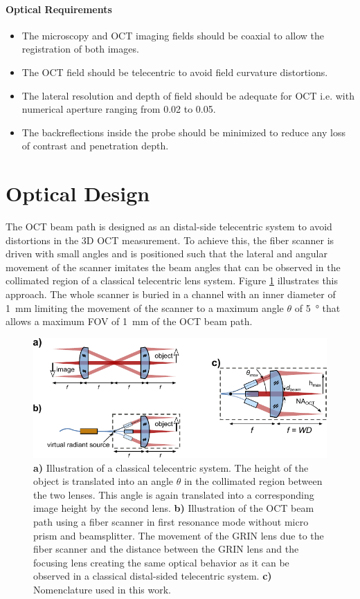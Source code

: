 \documentclass[10pt]{iopart}
\begin{document}
\paragraph{Optical Requirements}

\begin{itemize}
\item The microscopy and OCT imaging fields should be coaxial to allow the registration of both images. 
\item The OCT field should be telecentric to avoid field curvature distortions.
\item The lateral resolution and depth of field should be adequate for OCT i.e. with numerical aperture ranging from 0.02 to 0.05.
\item The backreflections inside the probe should be minimized to reduce any loss of contrast and penetration depth.
\end{itemize}

\section{Optical Design}
The OCT beam path is designed as an distal-side telecentric system to avoid distortions in the 3D OCT measurement. To achieve this, the fiber scanner is driven with small angles and is positioned such that the lateral and angular movement of the scanner imitates the beam angles that can be observed in the collimated region of a classical telecentric lens system. Figure \ref{fig:fps} illustrates this approach. The whole scanner is buried in a channel with an inner diameter of \SI{1}{\milli\meter} limiting the movement of the scanner to a maximum angle $\theta$ of \SI{5}{\degree} that allows a maximum FOV of \SI{1}{\milli\meter} of the OCT beam path.


\begin{figure}[h!]\centering \includegraphics[width=\columnwidth]{figures/fps.pdf}
      \caption{\textbf{a)} Illustration of a classical telecentric system. The height of the object is translated into an angle $\theta$ in the collimated region between the two lenses. This angle is again translated into a corresponding image height by the second lens.
      \textbf{b)} Illustration of the OCT beam path using a fiber scanner in first resonance mode without micro prism and beamsplitter. The movement of the GRIN lens due to the fiber scanner and the distance between the GRIN lens and the focusing lens creating the same optical behavior as it can be observed in a classical distal-sided telecentric system. \textbf{c)} Nomenclature used in this work.}
      \label{fig:fps}		
\end{figure}
\end{document}
